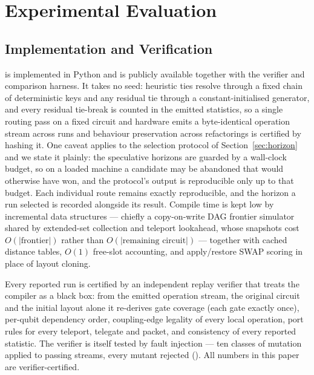 \section{Experimental Evaluation}
\label{sec:experiments}

\subsection{Implementation and Verification}
\label{sec:perf}

\PORTER{} is implemented in Python and is publicly available together
with the verifier and comparison harness. It takes no seed: heuristic
ties resolve through a fixed chain of deterministic keys and any
residual tie through a constant-initialised generator, and every
residual tie-break is counted in the emitted statistics, so a single
routing pass on a fixed circuit and hardware emits a byte-identical
operation stream across runs and behaviour preservation across
refactorings is certified by hashing it. One caveat applies to the
selection protocol of Section~\ref{sec:horizon} and we state it
plainly: the speculative horizons are guarded by a wall-clock budget, so
on a loaded machine a candidate may be abandoned that would otherwise
have won, and the protocol's output is reproducible only up to that
budget. Each individual route remains exactly reproducible, and the
horizon a run selected is recorded alongside its result. Compile time is
kept low by incremental data structures --- chiefly a copy-on-write DAG
frontier simulator\label{sec:sfc-simstate} shared by extended-set
collection and teleport lookahead, whose snapshots cost
$O(|\text{frontier}|)$ rather than $O(|\text{remaining circuit}|)$ ---
together with cached distance tables, $O(1)$ free-slot accounting, and
apply/restore SWAP scoring in place of layout cloning.

Every reported run is certified by an independent replay verifier that
treats the compiler as a black box: from the emitted operation stream,
the original circuit and the initial layout alone it re-derives gate
coverage (each gate exactly once), per-qubit dependency order,
coupling-edge legality of every local operation, port rules for every
teleport, telegate and packet, and consistency of every reported
statistic. The verifier is itself tested by fault injection --- ten
classes of mutation applied to passing streams, every mutant rejected
(\appVerification{}). All \PORTER{} numbers in this paper are
verifier-certified.

